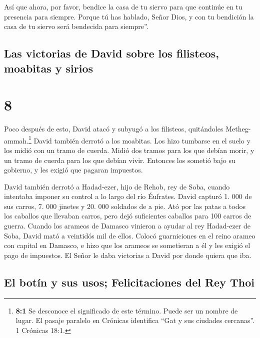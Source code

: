  Así que ahora, por favor, bendice la casa de tu siervo
para que continúe en tu presencia para siempre. Porque tú has hablado,
Señor Dios, y con tu bendición la casa de tu siervo será bendecida para
siempre''.

\hypertarget{las-victorias-de-david-sobre-los-filisteos-moabitas-y-sirios}{%
\subsection{Las victorias de David sobre los filisteos, moabitas y
sirios}\label{las-victorias-de-david-sobre-los-filisteos-moabitas-y-sirios}}

\hypertarget{section-7}{%
\section{8}\label{section-7}}

 Poco después de esto, David atacó y subyugó a los
filisteos, quitándoles Metheg-ammah.\footnote{\textbf{8:1} Se desconoce
  el significado de este término. Puede ser un nombre de lugar. El
  pasaje paralelo en Crónicas identifica ``Gat y sus ciudades
  cercanas''. 1 Crónicas 18:1.}  David también derrotó a
los moabitas. Los hizo tumbarse en el suelo y los midió con un tramo de
cuerda. Midió dos tramos para los que debían morir, y un tramo de cuerda
para los que debían vivir. Entonces los sometió bajo su gobierno, y les
exigió que pagaran impuestos.

 David también derrotó a Hadad-ezer, hijo de Rehob, rey de
Soba, cuando intentaba imponer su control a lo largo del río Éufrates.
 David capturó 1. 000 de sus carros, 7. 000 jinetes y 20.
000 soldados de a pie. Ató por las patas a todos los caballos que
llevaban carros, pero dejó suficientes caballos para 100 carros de
guerra.  Cuando los arameos de Damasco vinieron a ayudar
al rey Hadad-ezer de Soba, David mató a veintidós mil de ellos.
 Colocó guarniciones en el reino arameo con capital en
Damasco, e hizo que los arameos se sometieran a él y les exigió el pago
de impuestos. El Señor le daba victorias a David por donde quiera que
iba.

\hypertarget{el-botuxedn-y-sus-usos-felicitaciones-del-rey-thoi}{%
\subsection{El botín y sus usos; Felicitaciones del Rey
Thoi}\label{el-botuxedn-y-sus-usos-felicitaciones-del-rey-thoi}}

